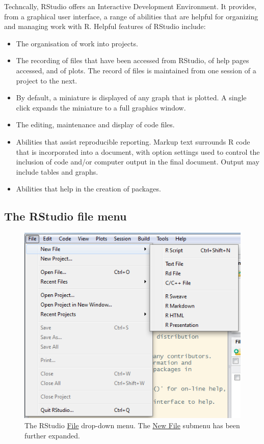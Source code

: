 Techncally, 
RStudio offers an Interactive Development Environment.  It
provides, from a graphical user interface, a range of abilities that
are helpful for organizing and managing work with R.  Helpful features
of RStudio include:
\begin{itemize}
\item The organisation of work into projects.
\item The recording of files that have been accessed from RStudio, of
  help pages accessed, and of plots.  The record of files is
  maintained from one session of a project to the next.
\item By default, a miniature is displayed of any graph that is
  plotted.  A single click expands the miniature to a full graphics
  window.
\item The editing, maintenance and display of code files.
\item Abilities that assist reproducible reporting.
     Markup text
  surrounds R code that is incorporated into a document, with option
  settings used to control the inclusion of code and/or computer
  output in the final document. Output may include tables and graphs.
\item Abilities that help in the creation of packages.
\end{itemize}

\subsection{The RStudio file menu}

\begin{figure}
\includegraphics{figs-inc/03i-menu.png}
\caption{The RStudio \underline{File} drop-down menu.  The
  \underline{New File} submenu has been further expanded.}\label{fig:file-menu}
\end{figure}

